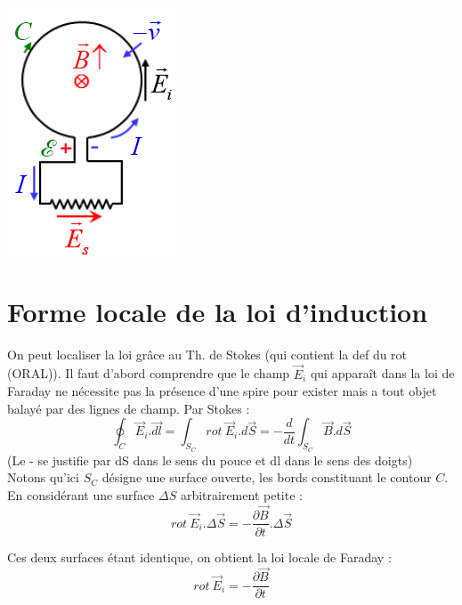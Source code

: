 \documentclass	[11pt, a4paper, openany]{book}
\begin{document}
\begin{center}
	\includegraphics[scale=0.45]{em/image15.png}\\
\end{center}

\section{Forme locale de la loi d'induction}
On peut localiser la loi grâce au Th. de Stokes (qui contient la def du rot (ORAL)). Il faut d'abord comprendre que le champ $\vec{E}_i$ qui apparaît dans la loi de Faraday ne nécessite pas la présence d'une spire pour exister mais a tout objet balayé par des lignes de champ. Par Stokes :
\begin{equation}
	\oint_C \vec{E}_i.\vec{dl} = \int_{S_C} rot\ \vec{E}_i.d\vec{S} = -\frac{d}{dt}\int_{S_C} \vec{B}.d\vec{S}
\end{equation}
(Le - se justifie par dS dans le sens du pouce et dl dans le sens des doigts)
\\
Notons qu'ici $S_C$ désigne une surface ouverte, les bords constituant le contour $C$.
En considérant une surface $\Delta S$ arbitrairement petite : 
\begin{equation}
	rot\ \vec{E}_i.\Delta\vec{S} = -\frac{\partial \vec{B}}{\partial t}.\Delta\vec{S}
\end{equation}

Ces deux surfaces étant identique, on obtient la loi locale de Faraday :
\begin{equation}
	rot\ \vec{E}_i = -\frac{\partial \vec{B}}{\partial t}
\end{equation}
\end{document}
